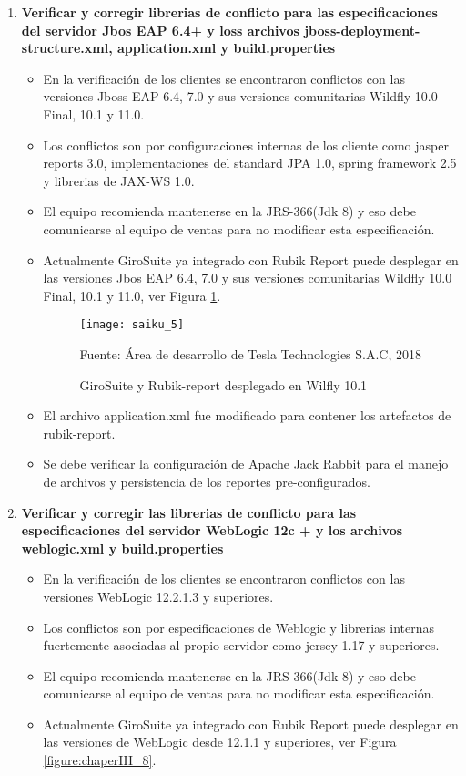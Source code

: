 \begin{spacing}{1.5}
\begin{enumerate}
			\item \textbf{Verificar y corregir librerias de conflicto para las especificaciones del servidor Jbos EAP 6.4+ y loss archivos jboss-deployment-structure.xml, application.xml y build.properties}
				\begin{itemize}
					\item En la verificaci\'{o}n de los clientes se encontraron conflictos con las versiones Jboss EAP 6.4, 7.0 y sus versiones comunitarias Wildfly 10.0 Final, 10.1 y 11.0.
					\item Los conflictos son por configuraciones internas de los cliente como jasper reports 3.0, implementaciones del standard JPA 1.0, spring framework 2.5 y librerias de JAX-WS 1.0.
					\item El equipo recomienda mantenerse en la JRS-366(Jdk 8) y eso debe comunicarse al equipo de ventas para no modificar esta especificaci\'{o}n.
					\item Actualmente GiroSuite ya integrado con Rubik Report puede desplegar en las versiones Jbos EAP 6.4, 7.0 y sus versiones comunitarias Wildfly 10.0 Final, 10.1 y 11.0, ver Figura \ref{figure:chaperIII_7}.
					\begin{figure}[H]
						\centering
						\texttt{[image: saiku\_5]}
						\caption {\centering \small{GiroSuite y Rubik-report desplegado en Wilfly 10.1}} \label{figure:chaperIII_7}
						\small {Fuente: \'{A}rea de desarrollo de Tesla Technologies S.A.C, 2018}
					\end{figure}
					
					\item El archivo application.xml fue modificado para contener los artefactos de rubik-report.
					\item Se debe verificar la configuraci\'{o}n de Apache Jack Rabbit para el manejo de archivos y persistencia de los reportes pre-configurados.
				\end{itemize}
			
			\item \textbf{Verificar y corregir las librerias de conflicto para las especificaciones del servidor WebLogic 12c + y los archivos weblogic.xml y build.properties}
				\begin{itemize}
					\item En la verificaci\'{o}n de los clientes se encontraron conflictos con las versiones WebLogic 12.2.1.3 y superiores.
					\item Los conflictos son por especificaciones de Weblogic y librerias internas fuertemente asociadas al propio servidor como jersey 1.17 y superiores.
					\item El equipo recomienda mantenerse en la JRS-366(Jdk 8) y eso debe comunicarse al equipo de ventas para no modificar esta especificaci\'{o}n.
					\item Actualmente GiroSuite ya integrado con Rubik Report puede desplegar en las versiones de WebLogic desde 12.1.1 y superiores, ver Figura \ref{figure:chaperIII_8}.
					

\end{itemize}
\end{enumerate}
\end{spacing}
